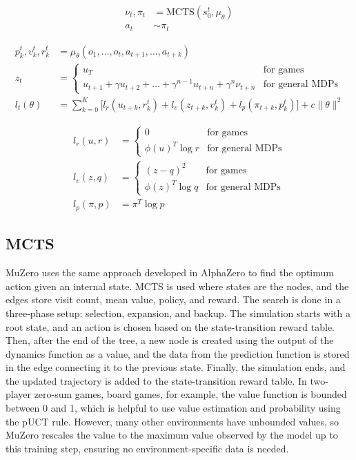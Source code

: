 \begin{align}
    \nu_t, \pi_t &= \text{MCTS}(s_0^t, \mu_\theta) \\
    a_t &\sim \pi_t
\end{align}

\begin{align}
    p_k^t, v_k^t, r_k^t &= \mu_\theta(o_1, \ldots, o_t, a_{t+1}, \ldots, a_{t+k}) \\
    z_t &= 
    \begin{cases} 
        u_T & \text{for games} \\
        u_{t+1} + \gamma u_{t+2} + \ldots + \gamma^{n-1} u_{t+n} + \gamma^n \nu_{t+n} & \text{for general MDPs}
    \end{cases} \\
    l_t(\theta) &=
    \sum_{k=0}^K \big[ l_r(u_{t+k}, r_k^t) + l_v(z_{t+k}, v_k^t) + l_p(\pi_{t+k}, p_k^t) \big] 
    + c \|\theta\|^2
\end{align}

\begin{align}
    l_r(u, r) &= 
    \begin{cases} 
        0 & \text{for games} \\
        \phi(u)^T \log r & \text{for general MDPs}
    \end{cases} \\
    l_v(z, q) &=
    \begin{cases} 
        (z - q)^2 & \text{for games} \\
        \phi(z)^T \log q & \text{for general MDPs}
    \end{cases} \\
    l_p(\pi, p) &= \pi^T \log p
\end{align}

\subsection*{MCTS}
MuZero uses the same approach developed in AlphaZero to find the optimum action given an internal 
state. MCTS is used where states are the nodes, and the edges store visit count, mean value, policy, and 
reward. The search is done in a three-phase setup: selection, expansion, and backup. The simulation 
starts with a root state, and an action is chosen based on the state-transition reward table. Then, after the end 
of the tree, a new node is created using the output of the dynamics function as a value, and the data from the 
prediction function is stored in the edge connecting it to the previous state. Finally, the simulation 
ends, and the updated trajectory is added to the state-transition reward table. In two-player zero-sum 
games, board games, for example, the value function is bounded between 0 and 1, which is helpful to 
use value estimation and probability using the pUCT rule. However, many other environments have 
unbounded values, so MuZero rescales the value to the maximum value observed by the model up to 
this training step, ensuring no environment-specific data is needed.

